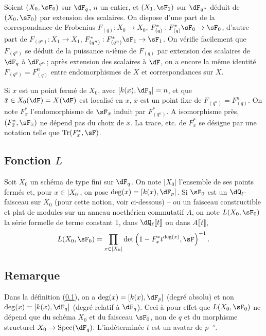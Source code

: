 Soient $(X_0,\sF_0)$ sur $\dF_q$, $n$ un entier, et $(X_1,\sF_1)$ sur 
$\dF_{q^n}$ déduit de $(X_0,\sF_0)$ par extension des scalaires. On dispose 
d'une part de la correspondance de Frobenius $F_{(q)}:X_0\to X_0$, 
$F_{(q)}^*:F_{(q)}^*\sF_0\to \sF_0$, d'autre part de 
$F_{(q^n)}:X_1\to X_1$, $F_{(q^n)}^*:F_{(q^n)}^*\sF_1\to\sF_1$. On vérifie 
facilement que $F_{(q^n)}$ se déduit de la puissance $n$-ième de $F_{(q)}$ 
par extension des scalaires de $\dF_q$ à $\dF_{q^n}$; après extension des 
scalaires à $\dF$, on a encore la même identité $F_{(q^n)}=F_{(q)}^n$ 
entre endomorphismes de $X$ et correspondances sur $X$. 

Si $x$ est un point fermé de $X_0$, avec $[k(x),\dF_q]=n$, et que 
$\bar x\in X_0(\dF) = X(\dF)$ est localisé en $x$, $\bar x$ est un point 
fixe de $F_{(q^n)}=F_{(q)}^n$. On note $F_x^*$ l'endomorphisme de 
$\sF_{\bar x}$ induit par $F_{(q^n)}^*$. A isomorphisme près, 
$(F_{\bar x}^*,\sF_{\bar x})$ ne dépend pas du choix de $\bar x$. La trace, 
etc. de $F_x^*$ se désigne par une notation telle que 
$\tr(F_x^*,\sF)$. 





\subsection{Fonction \texorpdfstring{$L$}{L}}\label{II:1-6}

Soit $X_0$ un schéma de type fini sur $\dF_q$. On note $|X_0|$ l'ensemble de 
ses points fermés et, pour $x\in |X_0|$, on pose $\deg(x)=[k(x),\dF_p]$. Si 
$\sF_0$ est un $\dQ_\ell$-faisceau sur $X_0$ (pour cette notion, voir 
ci-dessous) -- ou un faisceau constructible et plat de modules sur un 
anneau noethérien commutatif $A$, on note $L(X_0,\sF_0)$ la série formelle 
de terme constant $1$, dans $\dQ_\ell\llbracket t\rrbracket$ ou dans 
$A\llbracket t\rrbracket$, 
\[
  L(X_0,\sF_0) = \prod_{x\in|X_0|} \det\left(1-F_x^* t^{\deg(x)},\sF\right)^{-1} \text{.}
\]





\subsection{Remarque}\label{II:1-7}

Dans la définition (\ref{II:1-6}), on a $\deg(x)=[k(x),\dF_p]$ (degré 
absolu) et non $\deg(x)=[k(x),\dF_q]$ (degré relatif à $\dF_q$). Ceci à 
pour effet que $L(X_0,\sF_0)$ ne dépend que du schéma $X_0$ et du faisceau 
$\sF_0$, non de $q$ et du morphisme structurel $X_0\to\spec(\dF_q)$. 
L'indéterminée $t$ est un avatar de $p^{-s}$. 





